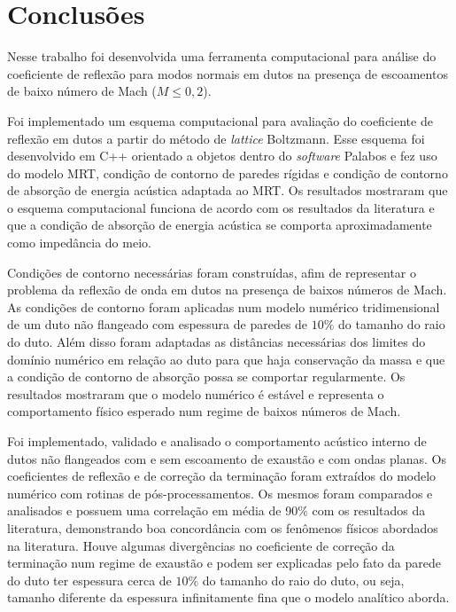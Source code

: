 \chapter{Conclusões}

Nesse trabalho foi desenvolvida uma ferramenta computacional para análise do coeficiente de reflexão para modos normais em dutos na presença de escoamentos de baixo número de Mach ($M \leq 0,2$). 

Foi implementado um esquema computacional para avaliação do coeficiente de reflexão em dutos a partir do método de \textit{lattice} Boltzmann. Esse esquema foi desenvolvido em C++ orientado a objetos dentro do \textit{software} Palabos e fez uso do modelo MRT, condição de contorno de paredes rígidas e condição de contorno de absorção de energia acústica adaptada ao MRT. Os resultados mostraram que o esquema computacional funciona de acordo com os resultados da literatura e que a condição de absorção de energia acústica se comporta aproximadamente como impedância do meio.

Condições de contorno necessárias foram construídas, afim de representar o problema da reflexão de onda em dutos na presença de baixos números de Mach. As condições de contorno foram aplicadas num modelo numérico tridimensional de um duto não flangeado com espessura de paredes de $10 \%$ do tamanho do raio do duto. Além disso foram adaptadas as distâncias necessárias dos limites do domínio numérico em relação ao duto para que haja conservação da massa e que a condição de contorno de absorção possa se comportar regularmente. Os resultados mostraram que o modelo numérico é estável e representa o comportamento físico esperado num regime de baixos números de Mach.

Foi implementado, validado e analisado o comportamento acústico interno de dutos não flangeados com e sem escoamento de exaustão e com ondas planas. Os coeficientes de reflexão e de correção da terminação foram extraídos do modelo numérico com rotinas de pós-processamentos. Os mesmos foram comparados e analisados e possuem uma correlação em média de 90\%  com os resultados da literatura, demonstrando boa concordância com os fenômenos físicos abordados na literatura. Houve algumas divergências no coeficiente de correção da terminação num regime de exaustão e podem ser explicadas pelo fato da parede do duto ter espessura cerca de $10 \%$ do tamanho do raio do duto, ou seja, tamanho diferente da espessura infinitamente fina que o modelo analítico aborda. 

